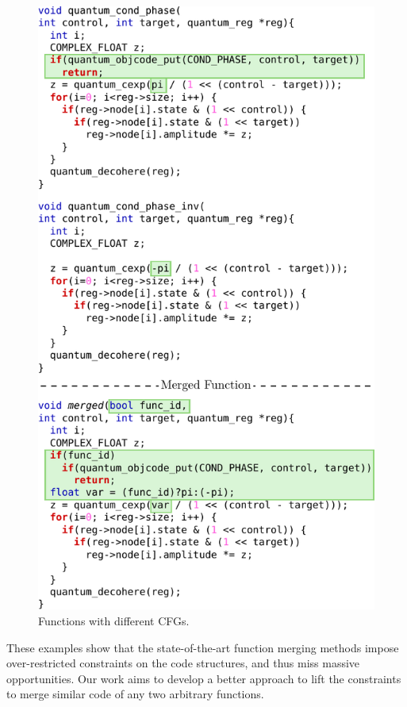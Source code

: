 \begin{figure}[t!]
  \centering
  \includegraphics[width=\linewidth]{figs/libquantum-example.pdf}
  \caption{Functions with different CFGs.}
  \label{fig:libquantum-example}
\end{figure}

These examples show that the state-of-the-art function merging methods impose over-restricted constraints on the code structures, and thus
miss massive opportunities. Our work aims to develop a better approach to lift the constraints to merge similar code of any two arbitrary
functions.
